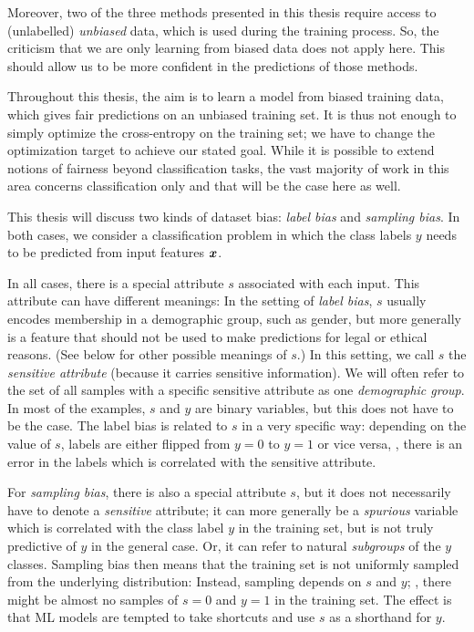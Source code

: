Moreover, two of the three methods presented in this thesis require access to (unlabelled) \emph{unbiased} data,
which is used during the training process.
So, the criticism that we are only learning from biased data does not apply here.
This should allow us to be more confident in the predictions of those methods.

Throughout this thesis, the aim is to learn a model from biased training data,
which gives fair predictions on an unbiased training set.
It is thus not enough to simply optimize the cross-entropy on the training set;
we have to change the optimization target to achieve our stated goal.
While it is possible to extend notions of fairness beyond classification tasks,
the vast majority of work in this area concerns classification only and that will be the case here as well.

This thesis will discuss two kinds of dataset bias: \emph{label bias} and \emph{sampling bias}.
In both cases,
we consider a classification problem in which the class labels $y$ needs to be predicted from input features ${\bm{x}}$.

In all cases, there is a special attribute $s$ associated with each input.
This attribute can have different meanings:
In the setting of \emph{label bias}, $s$ usually encodes membership in a demographic group, such as gender,
but more generally is a feature that should not be used to make predictions for legal or ethical reasons.
(See below for other possible meanings of $s$.)
In this setting, we call $s$ the \emph{sensitive attribute} (because it carries sensitive information).
We will often refer to the set of all samples with a specific sensitive attribute as one \emph{demographic group}.
In most of the examples, $s$ and $y$ are binary variables, but this does not have to be the case.
The label bias is related to $s$ in a very specific way:
depending on the value of $s$, labels are either flipped from $y=0$ to $y=1$ or vice versa,
\ie, there is an error in the labels which is correlated with the sensitive attribute.

For \emph{sampling bias},
there is also a special attribute $s$, but it does not necessarily have to denote a \emph{sensitive} attribute;
it can more generally be a \emph{spurious} variable which is correlated with the class label $y$ in the training set,
but is not truly predictive of $y$ in the general case.
Or, it can refer to natural \emph{subgroups} of the $y$ classes.
Sampling bias then means that the training set is not uniformly sampled from the underlying distribution:
Instead, sampling depends on $s$ and $y$;
\eg, there might be almost no samples of $s=0$ and $y=1$ in the training set.
The effect is that \ac{ML} models are tempted to take shortcuts and use $s$ as a shorthand for $y$.

